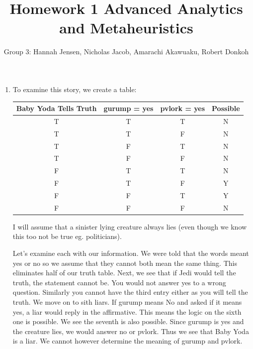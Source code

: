 \documentclass[11pt]{article}
\author{Group 3:  Hannah Jensen, Nicholas Jacob, Amarachi Akawuaku, Robert Donkoh}
\title{Homework 1 Advanced Analytics and Metaheuristics}
\begin{document}
\maketitle
%
\begin{enumerate}
\item To examine this story, we create a table:  
\begin{center}
\begin{tabular}{c|c|c|c}
Baby Yoda Tells Truth&gurump = yes&pvlork = yes& Possible\\ \hline
T&T& T&N\\
T&T&F&N\\
T &F &T&N\\
T&F&F&N\\
F&T&T&N\\
F&T&F&Y\\
F&F&T&Y\\
F&F&F&N

\end{tabular}
\end{center}

I will assume that a sinister lying creature always lies (even though we know this too not be true eg. politicians).  

Let's examine each with our information.  We were told that the words meant yes or no so we assume that they cannot both mean the same thing.  This eliminates half of our truth table.  Next, we see that if Jedi would tell the truth, the statement cannot be.  You would not answer yes to a wrong question.  Similarly you cannot have the third entry either as you will tell the truth.  We move on to sith liars.  If gurump means No and asked if it means yes, a liar would reply in the affirmative.  This means the logic on the sixth one is possible.  We see the seventh is also possible.  Since gurump is yes and the creature lies, we would answer no or pvlork.  Thus we see that Baby Yoda is a liar.  We cannot however determine the meaning of gurump and pvlork.



\end{enumerate}
\end{document}

